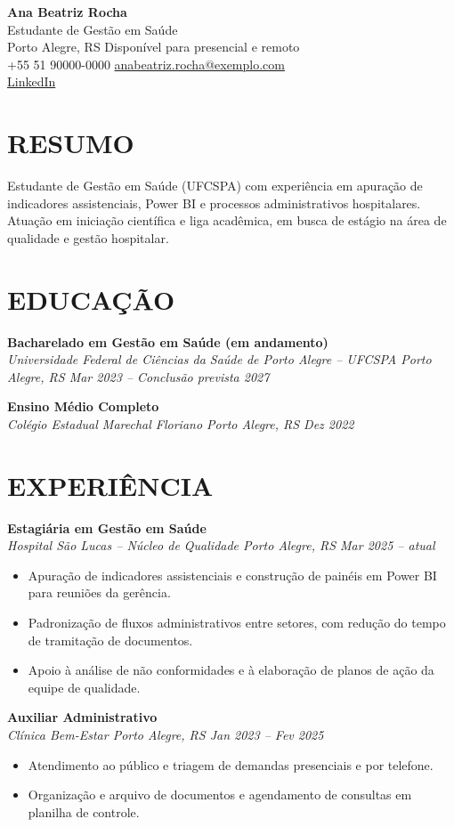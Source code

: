 \documentclass[a4paper,10pt]{article}
\newcommand{\entry}[2]{\noindent\textbf{#1}\\ \textit{#2}\par\vspace{0.15em}}
\begin{document}
{\Huge\textbf{Ana Beatriz Rocha}}\\[3pt]
{\large Estudante de Gestão em Saúde}\\[3pt]
Porto Alegre, RS \textbullet{} Disponível para presencial e remoto\\
+55 51 90000-0000 \textbullet{} \href{mailto:anabeatriz.rocha@exemplo.com}{anabeatriz.rocha@exemplo.com}\\
\href{https://www.linkedin.com/in/anabeatriz-rocha}{LinkedIn}

\section{RESUMO}
Estudante de Gestão em Saúde (UFCSPA) com experiência em apuração de indicadores assistenciais,
Power BI e processos administrativos hospitalares. Atuação em iniciação científica e liga acadêmica,
em busca de estágio na área de qualidade e gestão hospitalar.

\section{EDUCAÇÃO}
\entry{Bacharelado em Gestão em Saúde (em andamento)}{Universidade Federal de Ciências da Saúde de Porto Alegre -- UFCSPA \textbullet{} Porto Alegre, RS \textbullet{} Mar 2023 -- Conclusão prevista 2027}
\entry{Ensino Médio Completo}{Colégio Estadual Marechal Floriano \textbullet{} Porto Alegre, RS \textbullet{} Dez 2022}

\section{EXPERIÊNCIA}
\entry{Estagiária em Gestão em Saúde}{Hospital São Lucas -- Núcleo de Qualidade \textbullet{} Porto Alegre, RS \textbullet{} Mar 2025 -- atual}
\begin{itemize}
    \item Apuração de indicadores assistenciais e construção de painéis em Power BI para reuniões da gerência.
    \item Padronização de fluxos administrativos entre setores, com redução do tempo de tramitação de documentos.
    \item Apoio à análise de não conformidades e à elaboração de planos de ação da equipe de qualidade.
\end{itemize}

\entry{Auxiliar Administrativo}{Clínica Bem-Estar \textbullet{} Porto Alegre, RS \textbullet{} Jan 2023 -- Fev 2025}
\begin{itemize}
    \item Atendimento ao público e triagem de demandas presenciais e por telefone.
    \item Organização e arquivo de documentos e agendamento de consultas em planilha de controle.
\end{itemize}
\end{document}
